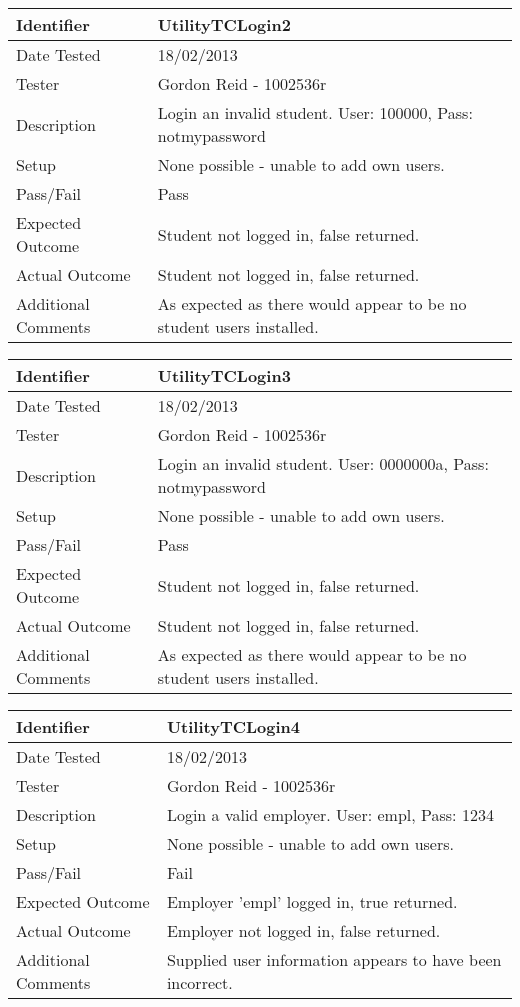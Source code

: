 \documentclass[11pt]{l3deliverable}
\begin{document}
\begin{tabularx}{\textwidth}{|T|L|}
\hline
Identifier & UtilityTCLogin2\\
\hline
Date Tested & 18/02/2013\\
\hline
Tester & Gordon Reid - 1002536r\\
\hline
Description & Login an invalid student. User: 100000, Pass: notmypassword\\
\hline
Setup & None possible - unable to add own users.\\
\hline
Pass/Fail & Pass\\
\hline
Expected Outcome & Student not logged in, false returned.\\
\hline
Actual Outcome & Student not logged in, false returned.\\
\hline
Additional Comments & As expected as there would appear to be no student 
users installed.\\
\hline
\end{tabularx}

\vspace{2em}

\begin{tabularx}{\textwidth}{|T|L|}
\hline
Identifier & UtilityTCLogin3\\
\hline
Date Tested & 18/02/2013\\
\hline
Tester & Gordon Reid - 1002536r\\
\hline
Description & Login an invalid student. User: 0000000a, Pass: notmypassword\\
\hline
Setup & None possible - unable to add own users.\\
\hline
Pass/Fail & Pass\\
\hline
Expected Outcome & Student not logged in, false returned.\\
\hline
Actual Outcome & Student not logged in, false returned.\\
\hline
Additional Comments & As expected as there would appear to be no student 
users installed.\\
\hline
\end{tabularx}

\vspace{2em}

\begin{tabularx}{\textwidth}{|T|L|}
\hline
Identifier & UtilityTCLogin4\\
\hline
Date Tested & 18/02/2013\\
\hline
Tester & Gordon Reid - 1002536r\\
\hline
Description & Login a valid employer. User: empl, Pass: 1234\\
\hline
Setup & None possible - unable to add own users.\\
\hline
Pass/Fail & Fail\\
\hline
Expected Outcome & Employer 'empl' logged in, true returned.\\
\hline
Actual Outcome & Employer not logged in, false returned.\\
\hline
Additional Comments & Supplied user information appears to have been incorrect.
\\
\hline
\end{tabularx}
\end{document}

